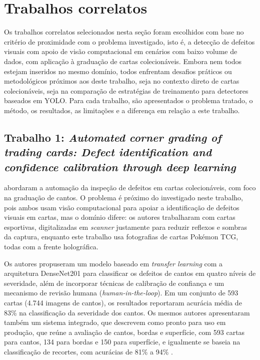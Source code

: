 \documentclass[
    12pt,                %
    openright,           %
    oneside,             %
    a4paper,             %
    english,             %
    brazil               %
]{abntex2}
\begin{document}
\section{Trabalhos correlatos}
\label{sec:trabalhos_correlatos}
\label{sec:trabalhos_relacionados}

Os trabalhos correlatos selecionados nesta seção foram escolhidos com base no critério de proximidade com o problema investigado, isto é, a detecção de defeitos visuais com apoio de visão computacional em cenários com baixo volume de dados, com aplicação à graduação de cartas colecionáveis. Embora nem todos estejam inseridos no mesmo domínio, todos enfrentam desafios práticos ou metodológicos próximos aos deste trabalho, seja no contexto direto de cartas colecionáveis, seja na comparação de estratégias de treinamento para detectores baseados em YOLO. Para cada trabalho, são apresentados o problema tratado, o método, os resultados, as limitações e a diferença em relação a este trabalho.

\subsection{Trabalho 1: \textit{Automated corner grading of trading cards: Defect identification and confidence calibration through deep learning}}

 abordaram a automação da inspeção de defeitos em cartas colecionáveis, com foco na graduação de cantos. O problema é próximo do investigado neste trabalho, pois ambos usam visão computacional para apoiar a identificação de defeitos visuais em cartas, mas o domínio difere: os autores trabalharam com cartas esportivas, digitalizadas em \textit{scanner} justamente para reduzir reflexos e sombras da captura, enquanto este trabalho usa fotografias de cartas Pokémon TCG, todas com a frente holográfica.

Os autores propuseram um modelo baseado em \textit{transfer learning} com a arquitetura DenseNet201 para classificar os defeitos de cantos em quatro níveis de severidade, além de incorporar técnicas de calibração de confiança e um mecanismo de revisão humana (\textit{human-in-the-loop}). Em um conjunto de 593 cartas (4.744 imagens de cantos), os resultados reportaram acurácia média de 83\% na classificação da severidade dos cantos. Os mesmos autores apresentaram também um sistema integrado, que descrevem como pronto para uso em produção, que reúne a avaliação de cantos, bordas e superfície, com 593 cartas para cantos, 134 para bordas e 150 para superfície, e igualmente se baseia na classificação de recortes, com acurácias de 81\% a 94\% \cite{Nahar2025b}.
\end{document}
